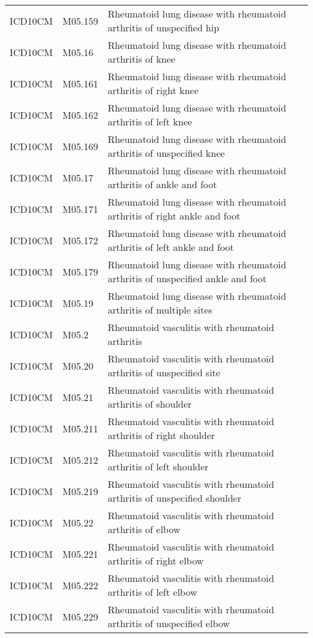 \begin{longtable}{p{}p{}p{}}
  ICD10CM & M05.159 & Rheumatoid lung disease with rheumatoid arthritis of unspecified hip \\ 
  ICD10CM & M05.16 & Rheumatoid lung disease with rheumatoid arthritis of knee \\ 
  ICD10CM & M05.161 & Rheumatoid lung disease with rheumatoid arthritis of right knee \\ 
  ICD10CM & M05.162 & Rheumatoid lung disease with rheumatoid arthritis of left knee \\ 
  ICD10CM & M05.169 & Rheumatoid lung disease with rheumatoid arthritis of unspecified knee \\ 
  ICD10CM & M05.17 & Rheumatoid lung disease with rheumatoid arthritis of ankle and foot \\ 
  ICD10CM & M05.171 & Rheumatoid lung disease with rheumatoid arthritis of right ankle and foot \\ 
  ICD10CM & M05.172 & Rheumatoid lung disease with rheumatoid arthritis of left ankle and foot \\ 
  ICD10CM & M05.179 & Rheumatoid lung disease with rheumatoid arthritis of unspecified ankle and foot \\ 
  ICD10CM & M05.19 & Rheumatoid lung disease with rheumatoid arthritis of multiple sites \\ 
  ICD10CM & M05.2 & Rheumatoid vasculitis with rheumatoid arthritis \\ 
  ICD10CM & M05.20 & Rheumatoid vasculitis with rheumatoid arthritis of unspecified site \\ 
  ICD10CM & M05.21 & Rheumatoid vasculitis with rheumatoid arthritis of shoulder \\ 
  ICD10CM & M05.211 & Rheumatoid vasculitis with rheumatoid arthritis of right shoulder \\ 
  ICD10CM & M05.212 & Rheumatoid vasculitis with rheumatoid arthritis of left shoulder \\ 
  ICD10CM & M05.219 & Rheumatoid vasculitis with rheumatoid arthritis of unspecified shoulder \\ 
  ICD10CM & M05.22 & Rheumatoid vasculitis with rheumatoid arthritis of elbow \\ 
  ICD10CM & M05.221 & Rheumatoid vasculitis with rheumatoid arthritis of right elbow \\ 
  ICD10CM & M05.222 & Rheumatoid vasculitis with rheumatoid arthritis of left elbow \\ 
  ICD10CM & M05.229 & Rheumatoid vasculitis with rheumatoid arthritis of unspecified elbow \\ 

\end{longtable}
